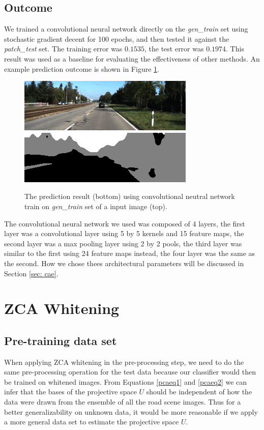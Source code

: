 \subsection{Outcome}
We trained a convolutional neural network directly on the \textit{gen\_train} set using stochastic gradient decent for 100 epochs, and then tested it against the \textit{patch\_test} set. The training error was $0.1535$, the test error was $0.1974$. This result was used as a baseline for evaluating the effectiveness of other methods. An example prediction outcome is shown in Figure \ref{cnnpredfig}.

\begin{figure}[h!]
\centering
\includegraphics[width=0.7\linewidth]{pics/img.png}
\includegraphics[width=0.7\linewidth]{pics/cae.png}
\caption{The prediction result (bottom) using convolutional neutral network train on \textit{gen\_train} set of a input image (top).}
\label{cnnpredfig}
\end{figure}

The convolutional neural network we used was composed of 4 layers, the first layer was a convolutional layer using 5 by 5 kernels and 15 feature maps, the second layer was a max pooling layer using 2 by 2 pools, the third layer was similar to the first using 24 feature maps instead, the four layer was the same as the second. How we chose thees architectural parameters will be discussed in Section \ref{sec: cae}.

\section{ZCA Whitening}
\subsection{Pre-training data set}
When applying ZCA whitening in the pre-processing step, we need to do the same pre-processing operation for the test data because our classifier would then be trained on whitened images. From Equations \ref{pcaeq1} and \ref{pcaeq2} we can infer that the bases of the projective space $U$ should be independent of how the data were drawn from the ensemble of all the road scene images. Thus for a better generalizability on unknown data, it would be more reasonable if we apply a more general data set to estimate the projective space $U$.

